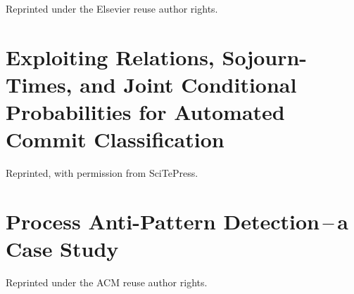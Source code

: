 \begin{appendices}
\vspace{10pt}
\noindent
{\footnotesize Reprinted under the Elsevier reuse author rights.}




\renewcommand{\appendixname}{Paper}
\chapter{Exploiting Relations, Sojourn-Times, and Joint Conditional Probabilities for Automated Commit Classification}\label{app:publ-honel2023hmm}
\chaptermark{\label{app:publ-honel2023hmm}}

\vspace{10pt}
\noindent
{\footnotesize Reprinted, with permission from {SciTePress}.}




\chapter{\texorpdfstring{Process Anti-Pattern Detection\,--\,a Case Study}{Process Anti-Pattern Detection - a Case Study}}\label{app:publ-picha_honel22pilot}
\chaptermark{\label{app:publ-picha_honel22pilot}}

\vspace{10pt}
\noindent
{\footnotesize Reprinted under the ACM reuse author rights.}




\renewcommand{\appendixname}{Article}

\end{appendices}
